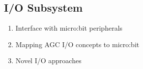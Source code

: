 \subsection{I/O Subsystem}

\begin{enumerate}
    \item Interface with micro:bit peripherals
    \item Mapping AGC I/O concepts to micro:bit
    \item Novel I/O approaches 
\end{enumerate}
